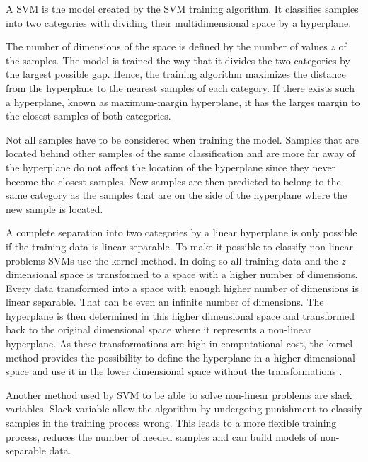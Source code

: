 A \acf{SVM} is the model created by the \ac{SVM} training algorithm.
It classifies samples into two categories with dividing their multidimensional space by a hyperplane. %

The number of dimensions of the space is defined by the number of values $z$ of the samples.
The model is trained the way that it divides the two categories by the largest possible gap. %
Hence, the training algorithm maximizes the distance from the hyperplane to the nearest samples of each category.
If there exists such a hyperplane, known as maximum-margin hyperplane, it has the larges margin to the closest samples of both categories. %

Not all samples have to be considered when training the model.
Samples that are located behind other samples of the same classification and are more far away of the hyperplane do not affect the location of the hyperplane since they never become the closest samples. %
New samples are then predicted to belong to the same category as the samples that are on the side of the hyperplane where the new sample is located.

A complete separation into two categories by a linear hyperplane is only possible if the training data is linear separable.
To make it possible to classify non-linear problems \acp{SVM} use the kernel method. %
In doing so all training data and the $z$ dimensional space is transformed to a space with a higher number of dimensions.
Every data transformed into a space with enough higher number of dimensions is linear separable.
That can be even an infinite number of dimensions. %
The hyperplane is then determined in this higher dimensional space and transformed back to the original dimensional space where it represents a non-linear hyperplane. %
As these transformations are high in computational cost, the kernel method provides the possibility to define the hyperplane in a higher dimensional space and use it in the lower dimensional space without the transformations \cite{Wikipedia2016SupportMachine}.

Another method used by \ac{SVM} to be able to solve non-linear problems are slack variables.
Slack variable allow the algorithm by undergoing punishment to classify samples in the training process wrong. %
This leads to a more flexible training process, reduces the number of needed samples and can build models of non-separable data.

